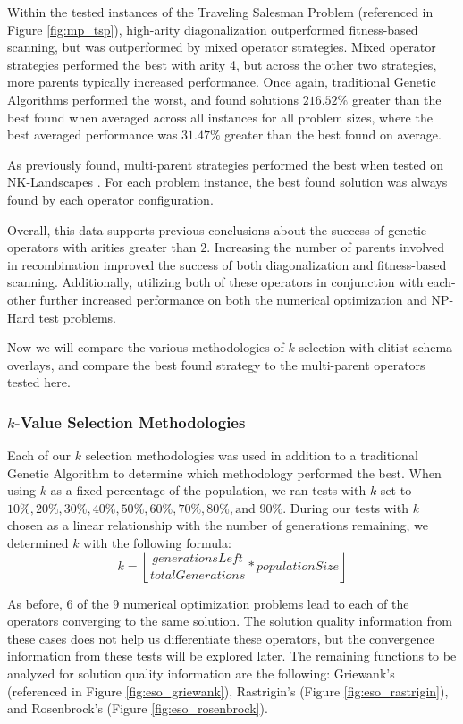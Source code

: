 Within the tested instances of the Traveling Salesman Problem (referenced in Figure \ref{fig:mp_tsp}), high-arity diagonalization outperformed fitness-based scanning, but was outperformed by mixed operator strategies. Mixed operator strategies performed the best with arity 4, but across the other two strategies, more parents typically increased performance. Once again, traditional Genetic Algorithms performed the worst, and found solutions $216.52\%$ greater than the best found when averaged across all instances for all problem sizes, where the best averaged performance was $31.47\%$ greater than the best found on average.

As previously found, multi-parent strategies performed the best when tested on NK-Landscapes \cite{Eiben96}. For each problem instance, the best found solution was always found by each operator configuration.

Overall, this data supports previous conclusions about the success of genetic operators with arities greater than $2$. Increasing the number of parents involved in recombination improved the success of both diagonalization and fitness-based scanning. Additionally, utilizing both of these operators in conjunction with each-other further increased performance on both the numerical optimization and NP-Hard test problems. 

Now we will compare the various methodologies of $k$ selection with elitist schema overlays, and compare the best found strategy to the multi-parent operators tested here. 

\subsubsection*{$k$-Value Selection Methodologies}
Each of our $k$ selection methodologies was used in addition to a traditional Genetic Algorithm to determine which methodology performed the best. When using $k$ as a fixed percentage of the population, we ran tests with $k$ set to $10\%, 20\%, 30\%, 40\%, 50\%, 60\%, 70\%, 80\%,\text{and } 90\%$. During our tests with $k$ chosen as a linear relationship with the number of generations remaining, we determined $k$ with the following formula:
\[
k = \left\lfloor \frac{generationsLeft}{totalGenerations} * populationSize \right\rfloor
\]

As before, 6 of the 9 numerical optimization problems lead to each of the operators converging to the same solution. The solution quality information from these cases does not help us differentiate these operators, but the convergence information from these tests will be explored later. The remaining functions to be analyzed for solution quality information are the following: Griewank's (referenced in Figure \ref{fig:eso_griewank}), Rastrigin's (Figure \ref{fig:eso_rastrigin}), and Rosenbrock's (Figure \ref{fig:eso_rosenbrock}).

